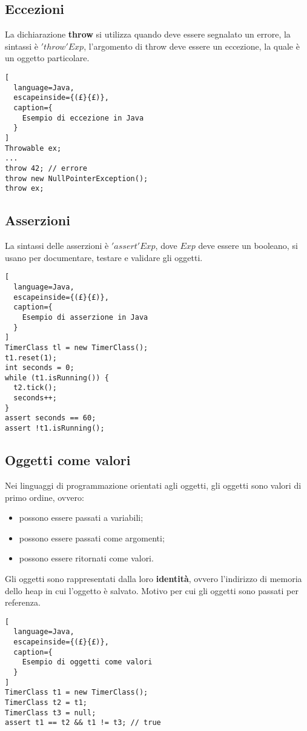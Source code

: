 \subsection{Eccezioni}
La dichiarazione \textbf{throw} si utilizza quando deve essere segnalato un
errore, la sintassi è $'throw'Exp$, l'argomento di throw deve essere un
eccezione, la quale è un oggetto particolare.
\begin{lstlisting}[
  language=Java,
  escapeinside={(£}{£)},
  caption={
    Esempio di eccezione in Java
  }
]
Throwable ex;
...
throw 42; // errore
throw new NullPointerException();
throw ex;
\end{lstlisting}

\subsection{Asserzioni}
La sintassi delle asserzioni è $'assert'Exp$, dove $Exp$ deve essere un
booleano, si usano per documentare, testare e validare gli oggetti.
\begin{lstlisting}[
  language=Java,
  escapeinside={(£}{£)},
  caption={
    Esempio di asserzione in Java
  }
]
TimerClass tl = new TimerClass();
t1.reset(1);
int seconds = 0;
while (t1.isRunning()) {
  t2.tick();
  seconds++;
}
assert seconds == 60;
assert !t1.isRunning();
\end{lstlisting}

\subsection{Oggetti come valori}
Nei linguaggi di programmazione orientati agli oggetti, gli oggetti sono valori
di primo ordine, ovvero:
\begin{itemize}
  \item possono essere passati a variabili;
  \item possono essere passati come argomenti;
  \item possono essere ritornati come valori.
\end{itemize}

Gli oggetti sono rappresentati dalla loro \textbf{identità}, ovvero l'indirizzo
di memoria dello heap in cui l'oggetto è salvato.
Motivo per cui gli oggetti sono passati per referenza.
\begin{lstlisting}[
  language=Java,
  escapeinside={(£}{£)},
  caption={
    Esempio di oggetti come valori
  }
]
TimerClass t1 = new TimerClass();
TimerClass t2 = t1;
TimerClass t3 = null;
assert t1 == t2 && t1 != t3; // true
\end{lstlisting}

